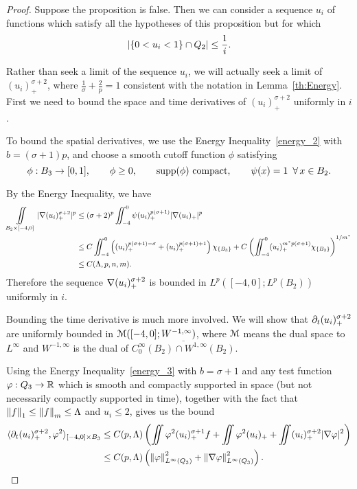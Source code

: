 \begin{proof}
Suppose the proposition is false.  Then we can consider a sequence $u_i$ of functions which satisfy all the hypotheses of this proposition but for which 
\[\left\lvert \{0 < u_i < 1\} \cap Q_2 \right\rvert \leq \frac{1}{i}.\]  

Rather than seek a limit of the sequence $u_i$, we will actually seek a limit of $(u_i)_+^{\sigma+2}$, where $\frac{1}{\sigma} + \frac{2}{p} = 1$ consistent with the notation in Lemma~\ref{th:Energy}.  First we need to bound the space and time derivatives of $(u_i)_+^{\sigma+2}$ uniformly in $i$.  


To bound the spatial derivatives, we use the Energy Inequality~\eqref{energy_2} with $b = (\sigma+1)p$, and choose a smooth cutoff function $\phi$ satisfying
\[ \phi:B_3 \to [0,1], \qquad \phi \geq 0, \qquad \operatorname{supp}(\phi) \textrm{ compact}, \qquad \psi(x)=1 \:\; \forall \, x \in B_2. \]

By the Energy Inequality, we have
\begin{align*} 
\iint\limits_{B_2\times [-4,0]} |\nabla (u_i)_+^{\sigma +2}|^p &\leq (\sigma +2)^p \iint_{-4}^0 \psi (u_i)_+^{p(\sigma +1)} |\nabla (u_i)_+|^p 
\\ &\leq C \iint_{-4}^0 \left(  (u_i)_+^{p(\sigma+1)-\sigma} + (u_i)_+^{p(\sigma+1)+1}  \right) \chi_{\{B_3\}} + C \left( \iint_{-4}^0 (u_i)_+^{m^\ast p(\sigma +1)} \chi_{\{B_3\}}  \right)^{1/m^\ast}
\\ &\leq C(\Lambda,p,n,m).
\end{align*}
Therefore the sequence $\nabla (u_i)_+^{\sigma+2}$ is bounded in $L^p([-4,0];L^p(B_2))$ uniformly in $i$.

Bounding the time derivative is much more involved.  We will show that $\partial_t (u_i)_+^{\sigma+2}$ are uniformly bounded in $\mathcal{M}([-4,0];W^{-1,\infty})$, where $\mathcal{M}$ means the dual space to $L^\infty$ and $W^{-1,\infty}$ is the dual of $\overline{C^\infty_0(B_2) \cap W^{1,\infty}(B_2)}$.  

Using the Energy Inequality~\eqref{energy_3} with $b = \sigma+1$ and any test function $\varphi: Q_3 \to \mathbb{R}$ which is smooth and compactly supported in space (but not necessarily compactly supported in time), together with the fact that $\left\lVert f\right\rVert_1 \leq \left\lVert f\right\rVert_m \leq \Lambda$ and $u_i \leq 2$, gives us the bound
\begin{align*}
\langle \partial_t (u_i)_+^{\sigma+2}, \varphi^2 \rangle_{[-4,0]\times B_3} &\leq C(p,\Lambda) \left(  \iint \varphi^2 (u_i)_+^{\sigma+1}f + \iint \varphi^2 (u_i)_+ + \iint (u_i)_+^{\sigma+2} |\nabla \varphi|^2  \right)
\\ &\leq C(p,\Lambda) \left(  \left\lVert\varphi\right\rVert_{L^\infty(Q_3)}^2 + \left\lVert\nabla \varphi\right\rVert_{L^\infty(Q_3)}^2  \right).
\end{align*}


\end{proof}

